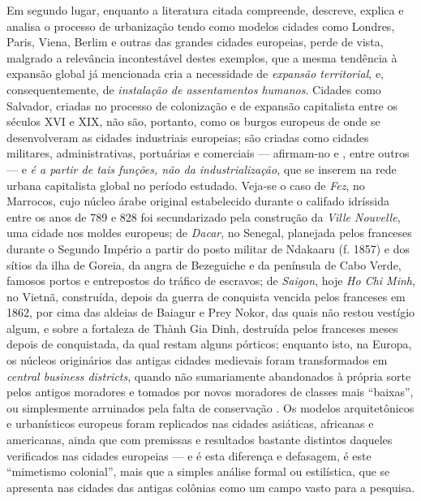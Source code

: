 Em segundo lugar, enquanto a literatura citada compreende, descreve, explica e analisa o processo de urbanização tendo como modelos cidades como Londres, Paris, Viena, Berlim e outras das grandes cidades europeias, perde de vista, malgrado a relevância incontestável destes exemplos, que a mesma tendência à expansão global já mencionada cria a necessidade de \textit{expansão territorial}, e, consequentemente, de \textit{instalação de assentamentos humanos}. Cidades como Salvador, criadas no processo de colonização e de expansão capitalista entre os séculos XVI e XIX, não são, portanto, como os burgos europeus de onde se desenvolveram as cidades industriais europeias; são criadas como cidades militares, administrativas, portuárias e comerciais --- afirmam-no  e , entre outros --- e \textit{é a partir de tais funções, não da industrialização}, que se inserem na rede urbana capitalista global no período estudado. Veja-se o caso de \textit{Fez}, no Marrocos, cujo núcleo árabe original estabelecido durante o califado idríssida entre os anos de 789 e 828 foi secundarizado pela construção da \textit{Ville Nouvelle}, uma cidade nos moldes europeus; de \textit{Dacar}, no Senegal, planejada pelos franceses durante o Segundo Império a partir do posto militar de Ndakaaru (f. 1857) e dos sítios da ilha de Goreia, da angra de Bezeguiche e da península de Cabo Verde, famosos portos e entrepostos do tráfico de escravos; de \textit{Saigon}, hoje \textit{Ho Chi Minh}, no Vietnã, construída, depois da guerra de conquista vencida pelos franceses em 1862, por cima das aldeias de Baiagur e Prey Nokor, das quais não restou vestígio algum, e sobre a fortaleza de Thành Gia Dinh, destruída pelos franceses meses depois de conquistada, da qual restam alguns pórticos; enquanto isto, na Europa, os núcleos originários das antigas cidades medievais foram transformados em \textit{central business districts}, quando não sumariamente abandonados à própria sorte pelos antigos moradores e tomados por novos moradores de classes mais ``baixas'', ou simplesmente arruinados pela falta de conservação \cite[pp.~607-612]{benevolo_historia_1983}. Os modelos arquitetônicos e urbanísticos europeus foram replicados nas cidades asiáticas, africanas e americanas, ainda que com premissas e resultados bastante distintos daqueles verificados nas cidades europeias --- e é esta diferença e defasagem, é este ``mimetismo colonial'', mais que a simples análise formal ou estilística, que se apresenta nas cidades das antigas colônias como um campo vasto para a pesquisa.

